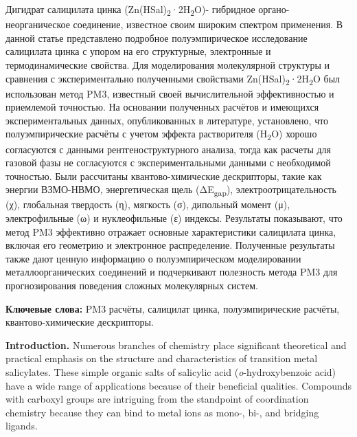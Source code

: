 Дигидрат салицилата цинка
(Zn(HSal)\textsubscript{2}·2H\textsubscript{2}O)- гибридное
органо-неорганическое соединение, известное своим широким спектром
применения. В данной статье представлено подробное полуэмпирическое
исследование салицилата цинка с упором на его структурные, электронные и
термодинамические свойства. Для моделирования молекулярной структуры и
сравнения с экспериментально полученными свойствами
Zn(HSal)\textsubscript{2}·2H\textsubscript{2}O был использован метод
PM3, известный своей вычислительной эффективностью и приемлемой
точностью. На основании полученных расчётов и имеющихся
экспериментальных данных, опубликованных в литературе, установлено, что
полуэмпирические расчёты с учетом эффекта растворителя
(H\textsubscript{2}O) хорошо согласуются с данными рентгеноструктурного
анализа, тогда как расчеты для газовой фазы не согласуются с
экспериментальными данными с необходимой точностью. Были рассчитаны
квантово-химические дескрипторы, такие как энергии ВЗМО-НВМО,
энергетическая щель (ΔE\textsubscript{gap}), электроотрицательность (χ),
глобальная твердость (η), мягкость (σ), дипольный момент (μ),
электрофильные (ω) и нуклеофильные (ε) индексы. Результаты показывают,
что метод PM3 эффективно отражает основные характеристики салицилата
цинка, включая его геометрию и электронное распределение. Полученные
результаты также дают ценную информацию о полуэмпирическом моделировании
металлоорганических соединений и подчеркивают полезность метода PM3 для
прогнозирования поведения сложных молекулярных систем.

{\bfseries Ключевые слова:} PM3 расчёты, салицилат цинка, полуэмпирические
расчёты, квантово-химические дескрипторы.

{\bfseries Introduction.} Numerous branches of chemistry place significant
theoretical and practical emphasis on the structure and characteristics
of transition metal salicylates. These simple organic salts of salicylic
acid (\emph{o}-hydroxybenzoic acid) have a wide range of applications
because of their beneficial qualities. Compounds with carboxyl groups
are intriguing from the standpoint of coordination chemistry because
they can bind to metal ions as mono-, bi-, and bridging ligands.

